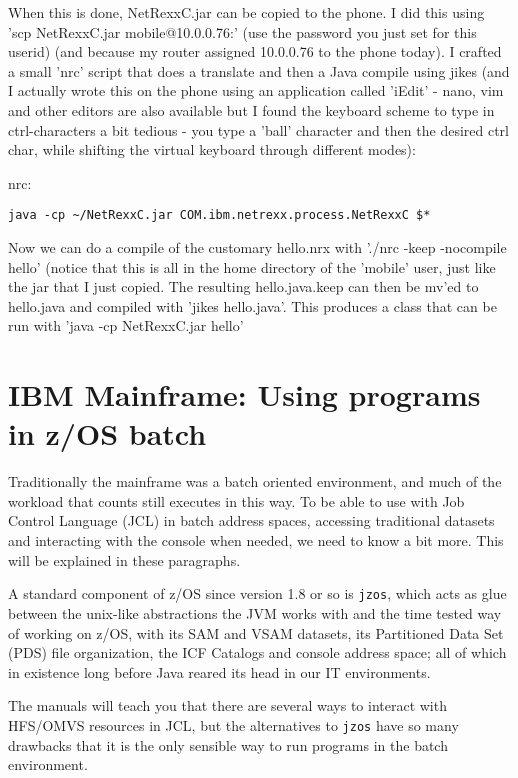 When this is done, NetRexxC.jar can be copied to the phone. I did this using 'scp NetRexxC.jar mobile@10.0.0.76:' (use the password you just set for this userid) (and because my router assigned 10.0.0.76 to the phone today). I crafted a small 'nrc' script that does a translate and then a Java compile using jikes (and I actually wrote this on the phone using an application called 'iEdit' - nano, vim and other editors are also available but I found the keyboard scheme to type in ctrl-characters a bit tedious - you type a 'ball' character and then the desired ctrl char, while shifting the virtual keyboard through different modes):

nrc:
\begin{verbatim}
java -cp ~/NetRexxC.jar COM.ibm.netrexx.process.NetRexxC $*
\end{verbatim}
Now we can do a compile of the customary hello.nrx with './nrc -keep -nocompile hello' (notice that this is all in the home directory of the 'mobile' user, just like the jar that I just copied. The resulting hello.java.keep can then be mv'ed to hello.java and compiled with 'jikes hello.java'. This produces a class that can be run with 'java -cp NetRexxC.jar hello'
\section{IBM Mainframe: Using \nr{} programs in z/OS batch}
Traditionally the mainframe was a batch oriented environment, and much
of the workload that counts still executes in this way. To be able to
use \nr{}with Job Control Language (JCL) in batch address spaces,
accessing traditional datasets and interacting with the console when
needed, we need to know a bit more. This will be explained in these paragraphs.

A standard component of z/OS since version 1.8 or so is \texttt{jzos},
which acts as glue between the unix-like abstractions the JVM works
with and the time tested way of working on z/OS, with its SAM and VSAM
datasets, its Partitioned Data Set (PDS) file organization, the ICF
Catalogs and console address space; all of which in existence long
before Java reared its head in our IT environments.

The manuals will teach you that there are several ways to
interact with HFS/OMVS resources in JCL, but the alternatives to
\texttt{jzos} have so many drawbacks that it is the only
sensible way to run \nr{} programs in the batch environment. 
